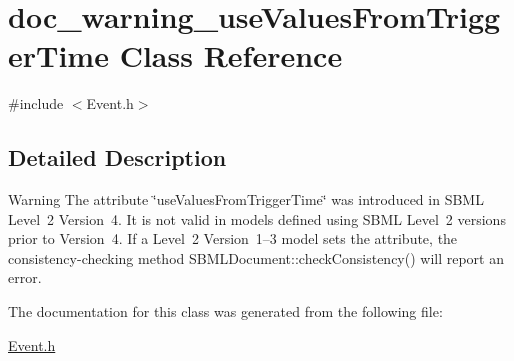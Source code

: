 \hypertarget{classdoc__warning__use_values_from_trigger_time}{}\section{doc\+\_\+warning\+\_\+use\+Values\+From\+Trigger\+Time Class Reference}
\label{classdoc__warning__use_values_from_trigger_time}


{\ttfamily \#include $<$Event.\+h$>$}



\subsection{Detailed Description}
\begin{DoxyWarning}{Warning}
The attribute \char`\"{}use\+Values\+From\+Trigger\+Time\char`\"{} was introduced in S\+B\+ML Level~2 Version~4. It is not valid in models defined using S\+B\+ML Level~2 versions prior to Version~4. If a Level~2 Version~1--3 model sets the attribute, the consistency-\/checking method S\+B\+M\+L\+Document\+::check\+Consistency() will report an error. 
\end{DoxyWarning}


The documentation for this class was generated from the following file\+:\begin{DoxyCompactItemize}
\item 
\hyperlink{_event_8h}{Event.\+h}\end{DoxyCompactItemize}
